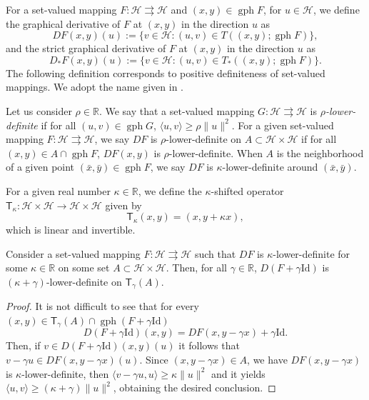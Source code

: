 \documentclass[smallextended,envcountsect,envcountsame]{svjour3}
\renewcommand{\H}{\mathcal{H}}
\newcommand{\R}{\mathbb{R}}
\newcommand{\tto}{\rightrightarrows}
\newcommand{\gph}{\operatorname{gph}}
\newcommand{\1}{\mathds{1}}
\begin{document}
    For a set-valued mapping $F\colon \H\tto \H$ and $(x,y)\in \gph F$, for $u\in \H$, we define the graphical derivative of $F$ at $(x,y)$ in the direction $u$ as \begin{equation*}
	    DF(x,y)(u) :=  \{v\in\H : (u,v)\in T((x,y);\gph F)\},
	\end{equation*}
	and the strict graphical derivative of $F$ at $(x,y)$ in the direction $u$ as 
    \begin{equation*}
        D_\ast F(x,y)(u) := \{v\in\H : (u,v)\in T_\ast((x,y);\gph F)\}.
    \end{equation*}
    The following definition corresponds to positive definiteness of set-valued mappings. We adopt the name given in \cite{aragon2024coderivative}.
	\begin{definition}\label{low-def}
		Let us consider $\rho\in\R$. We say that a set-valued mapping $G\colon \H\tto \H$ is \emph{$\rho$-lower-definite} if for all $(u,v)\in \gph G$, $\langle u,v\rangle\geq \rho\|u\|^2$. For a given set-valued mapping $F\colon \H\tto \H$, we say $DF$ is $\rho$-lower-definite on $A\subset\H\times \H$ if for all $(x,y)\in A\cap \gph F$, $DF(x,y)$ is $\rho$-lower-definite. When $A$ is the neighborhood of a given point $(\bar x,\bar y)\in \gph F$, we say $DF$ is $\kappa$-lower-definite around $(\bar x,\bar y)$.
	\end{definition}
	For a given real number $\kappa\in\R$, we define the $\kappa$-shifted operator $\mathsf{T}_\kappa\colon\H\times \H\to \H\times \H$ given by 
    \begin{equation}\label{T_k}
        \mathsf{T}_\kappa(x,y) = (x,y+\kappa x),
    \end{equation}
    which is linear and invertible.
	\begin{lemma}\label{sum-rule-gd}
		Consider a set-valued mapping $F\colon \H\tto \H$  such that $DF$ is $\kappa$-lower-definite for some $\kappa\in\R$ on some set $A\subset \H\times \H$. Then, for all $\gamma\in\R$, $D(F+\gamma\text{Id})$ is $(\kappa+\gamma)$-lower-definite on $\mathsf{T}_\gamma(A)$.
	\end{lemma}
	\begin{proof}
		 It is not difficult to see that for every $(x,y)\in \mathsf{T}_\gamma(A)\cap \gph (F+\gamma\text{Id})$
		\begin{equation*}
			D(F+\gamma\text{Id})(x,y) = DF(x,y-\gamma x) + \gamma\text{Id}.
		\end{equation*}
		Then, if $v\in D(F+\gamma\text{Id})(x,y)(u)$ it follows that $v-\gamma u\in DF(x,y-\gamma x)(u)$. Since $(x,y-\gamma x)\in A$, we have $DF(x,y-\gamma x)$ is $\kappa$-lower-definite, then $\langle v-\gamma u,u\rangle\geq \kappa\|u\|^2$ and it yields $\langle u,v\rangle\geq (\kappa + \gamma)\|u\|^2$, obtaining the desired conclusion.
	\end{proof}
    
\end{document}
